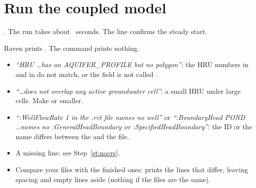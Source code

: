\section{Run the coupled model}

\see {}. The run takes about ~seconds. The line
 confirms the steady start.
\begin{tocheck}
Raven prints . The command
 prints nothing.
\end{tocheck}
\begin{trouble}
\begin{itemize}
\item \emph{``HRU \dots has an AQUIFER\_PROFILE but no polygon''}: the HRU numbers in  and in
   do not match, or the field is not called .
\item \emph{``\dots does not overlap any active groundwater cell''}: a small HRU under large cells. Make
   or  smaller.
\item \emph{``:WellFlowRate 1 in the .rvt file names no well''} or \emph{``:BoundaryHead POND \dots names no
  :GeneralHeadBoundary or :SpecifiedHeadBoundary''}: the ID or the name differs between the  and the
   file.
\item A missing  line: see Step~\ref{st:nocrs}.
\item Compare your files with the finished ones:  prints the lines that
  differ, leaving spacing and empty lines aside (nothing if the files are the same).
\end{itemize}
\end{trouble}

